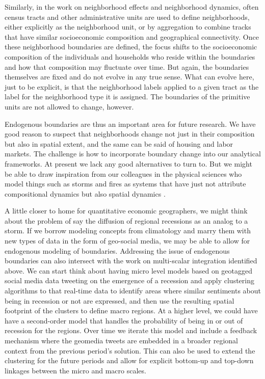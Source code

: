 \documentclass[11pt]{article}
\begin{document}
Similarly, in the work on neighborhood effects and neighborhood dynamics, often
census tracts and other administrative units are used to define neighborhoods,
either explicitly as the neighborhood unit, or by aggregation to combine tracks
that have similar socioeconomic composition and geographical connectivity.
Once these neighborhood boundaries are defined, the focus shifts to the
socioeconomic composition of the individuals and households who reside within
the boundaries and how that composition may fluctuate over time. But again, the
boundaries themselves are fixed and do not evolve in any true sense. What can
evolve here, just to be explicit, is that the neighborhood labels applied to a
given tract as the label for the neighborhood type it is assigned. The
boundaries of the primitive units are not allowed to change, however.

Endogenous boundaries are thus an important area for future research. We have
good reason to suspect that neighborhoods change not just in their
composition but also in spatial extent, and the same can be said of housing and
labor markets. The challenge is how to incorporate boundary change into our
analytical frameworks. At present we lack any good alternatives to turn to. But
we might be able to draw inspiration from our colleagues in the physical
sciences who model things such as storms and fires as systems that have just not
attribute compositional dynamics but also spatial dynamics \cite{yuan2001representing}. 

A little closer to home for quantitative economic geographers, we might think
about the problem of say the diffusion of regional recessions as an analog to a
storm. If we borrow modeling concepts from climatology and marry them with new
types of data in the form of geo-social media, we may be able to allow for
endogenous modeling of boundaries. Addressing the issue of endogenous
boundaries can also intersect with the work on multi-scalar integration
identified above. We can start think about having micro level models based 
on geotagged social media data tweeting on the emergence of a recession and
apply clustering algorithms to that real-time data to identify areas where 
similar sentiments about being in recession or not are expressed, and then use
the resulting spatial footprint of the clusters to define macro regions. At a
higher level, we could have have a second-order model that handles the
probability of being in or out of recession for the regions. Over time we
iterate this model and include a feedback mechanism where the geomedia tweets
are embedded in a broader regional context from the previous period's solution.
This can also be used to extend the clustering for the future periods and allow
for explicit bottom-up and top-down linkages between the micro and macro scales.
\end{document}
